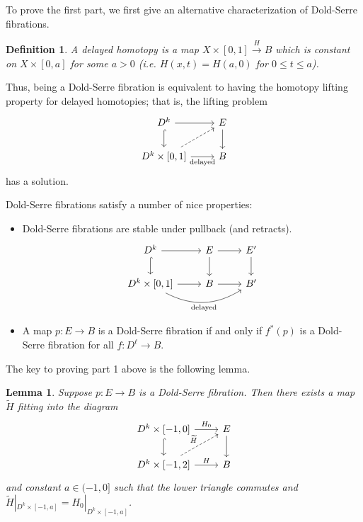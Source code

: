 \documentclass{article}
\newtheorem{lemma}[theorem]{Lemma}
\newtheorem{definition}[theorem]{Definition}
\newtheorem{proposed work}[theorem]{Proposed Work}
\begin{document}
To prove the first part, we first give an alternative characterization of Dold-Serre fibrations.

\begin{definition}
A \emph{delayed homotopy} is a map $X \times [0,1] \overset{H}{\to} B$ which is constant on $X \times [0,a]$ for some $a > 0$ (i.e. $H(x,t) = H(a,0)$ for $0 \leq t \leq a$).
\end{definition}

Thus, being a Dold-Serre fibration is equivalent to having the homotopy lifting property for delayed homotopies; that is, the lifting problem
\begin{equation*}
\begin{tikzcd}
D^k \arrow[r] \arrow[d,hookrightarrow] & E \arrow[d] \\
D^k \times [0,1] \arrow[r, "\text{delayed}"'] \arrow[ur, dashed] & B
\end{tikzcd}
\end{equation*}
has a solution.

Dold-Serre fibrations satisfy a number of nice properties:

\begin{itemize}
\item Dold-Serre fibrations are stable under pullback (and retracts).
\begin{equation*}
\begin{tikzcd}
D^k \arrow[r] \arrow[d,hookrightarrow] & E \arrow[r] \arrow[d] & E' \arrow[d] \\
D^k \times [0,1] \arrow[r] \arrow[rr, "\text{delayed}"',bend right]& B \arrow[r] & B'
\end{tikzcd}
\end{equation*}

\item A map $p: E \to B$ is a Dold-Serre fibration if and only if $f^*(p)$ is a Dold-Serre fibration for all $f: D^\ell \to B$. 
\end{itemize}

The key to proving part 1 above is the following lemma.

\begin{lemma}
Suppose $p: E \to B$ is a Dold-Serre fibration. Then there exists a map $\widetilde{H}$ fitting into the diagram
\begin{equation*}
\begin{tikzcd}
D^k \times [-1,0] \arrow[r, "H_0"] \arrow[d, hookrightarrow] & E \arrow[d] \\
D^k \times [-1,2] \arrow[ur, dashed, "\widetilde{H}"] \arrow[r, "H"] & B
\end{tikzcd}
\end{equation*}
and constant $a \in (-1,0]$ such that the lower triangle commutes and $\widetilde{H}|_{D^k \times [-1,a]} = H_0|_{D^k \times [-1,a]}$.
\end{lemma}
\end{document}
